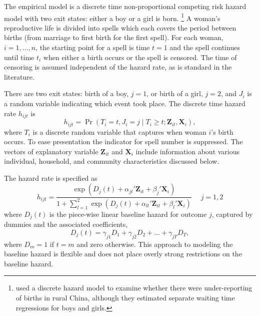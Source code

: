 \documentclass[12pt,letterpaper]{article}
\begin{document}
The empirical model is a discrete time non-proportional competing risk hazard model with 
two exit states: either a boy or a girl is born.%
\footnote{
\cite{merli00} used a discrete hazard model to examine whether 
there were under-reporting of births in rural China, although they 
estimated separate waiting time regressions for boys and girls.
}
A woman's reproductive life is divided into spells which each covers the period between
births (from marriage to first birth for the first spell).
For each woman, $i=1,\ldots,n$, the starting point for a spell is time $t=1$ and 
the spell continues until time $t_i$ when either a birth occurs or the spell is censored.
The time of censoring is assumed independent of the hazard rate,
as is standard in the literature.

There are two exit states: birth of a boy, $j=1$, or birth of a girl, $j=2$, and 
$J_i$ is a random variable indicating which event took place.
The discrete time hazard rate $h_{ijt}$ is
\begin{equation}
 h_{ijt} = \Pr (T_i=t, J_i=j \mid T_i \geq t; \mathbf{Z}_{it},\mathbf{X}_{i} ),
\end{equation}
where $T_i$ is a discrete random variable that captures when woman $i$'s birth occurs.
To ease presentation the indicator for spell number is suppressed.
The vectors of explanatory variable $\mathbf{Z}_{it}$ and $\mathbf{X}_{i}$ include 
information about various individual, household, and community characteristics 
discussed below.

The hazard rate is specified as
\begin{equation}
 h_{ijt} = \frac{\exp(D_j(t) + \alpha_{jt}'\mathbf{Z}_{it} + \beta_j'\mathbf{X}_{i})} 
 {1 + \sum_{l=1}^2 \exp(D_j(t) + \alpha_{lt}'\mathbf{Z}_{it} + \beta_l'\mathbf{X}_{i})} \: \: \; \; \;  j = 1,2
 \label{eq:hazard}
\end{equation}
where $D_{j}(t)$ is the piece-wise linear baseline hazard for outcome $j$, captured
by dummies and the associated coefficients,
\begin{equation}
D_j(t) = \gamma_{j1} D_1 + \gamma_{j2} D_2 + \ldots + \gamma_{jT} D_T,
\end{equation}
where $D_m = 1$ if $t=m$ and zero otherwise.
This approach to modeling the baseline hazard is flexible and does not place overly strong 
restrictions on the baseline hazard.
\end{document}
